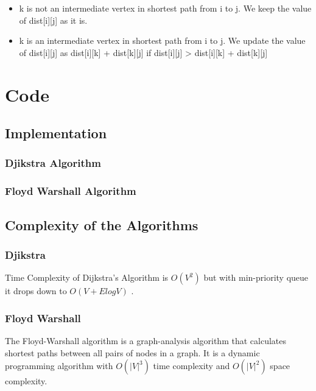 \documentclass[a4paper, 12pt]{article}
\begin{document}
\begin{itemize}
      \item k is not an intermediate vertex in shortest path from i to j. We keep the value of dist[i][j] as it is.
      \item  k is an intermediate vertex in shortest path from i to j. We update the value of dist[i][j] as dist[i][k] + dist[k][j] if dist[i][j] > dist[i][k] + dist[k][j]
\end{itemize}

\section{Code}
\subsection{Implementation}

\subsubsection*{Djikstra Algorithm}


\subsubsection*{Floyd Warshall Algorithm}


\subsection{Complexity of the Algorithms}

\subsubsection*{Djikstra}

Time Complexity of Dijkstra's Algorithm is $O ( V^2 )$ but with min-priority queue it drops down to $O ( V + E l o g V )$ .

\subsubsection*{Floyd Warshall}

The Floyd-Warshall algorithm is a graph-analysis algorithm that calculates shortest paths between all pairs of nodes in a graph. It is a dynamic programming algorithm with $O(|V|^3)$ time complexity and $O(|V|^2)$ space complexity.
\end{document}
